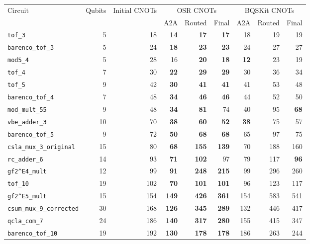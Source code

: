 \begin{table}[p]
\centering
\scriptsize
\begin{tabular}{lrr|rrr|rrr}
\hline
Circuit & Qubits & Initial CNOTs & \multicolumn{3}{c|}{OSR CNOTs} & \multicolumn{3}{c}{BQSKit CNOTs} \\
 & & & A2A & Routed & Final & A2A & Routed & Final \\
\hline
\texttt{tof\_3} & 5 & 18 & \textbf{14} & \textbf{17} & \textbf{17} & 18 & 19 & 19 \\
\texttt{barenco\_tof\_3} & 5 & 24 & \textbf{18} & \textbf{23} & \textbf{23} & 24 & 27 & 27 \\
\texttt{mod5\_4} & 5 & 28 & 16 & \textbf{20} & \textbf{18} & \textbf{12} & 23 & 19 \\
\texttt{tof\_4} & 7 & 30 & \textbf{22} & \textbf{29} & \textbf{29} & 30 & 36 & 34 \\
\texttt{tof\_5} & 9 & 42 & \textbf{30} & \textbf{41} & \textbf{41} & 41 & 53 & 48 \\
\texttt{barenco\_tof\_4} & 7 & 48 & \textbf{34} & \textbf{46} & \textbf{46} & 44 & 52 & 50 \\
\texttt{mod\_mult\_55} & 9 & 48 & \textbf{34} & \textbf{81} & 74 & 40 & 95 & \textbf{68} \\
\texttt{vbe\_adder\_3} & 10 & 70 & \textbf{38} & \textbf{60} & \textbf{52} & \textbf{38} & 75 & 57 \\
\texttt{barenco\_tof\_5} & 9 & 72 & \textbf{50} & \textbf{68} & \textbf{68} & 65 & 97 & 75 \\
\texttt{csla\_mux\_3\_original} & 15 & 80 & \textbf{68} & \textbf{155} & \textbf{139} & 70 & 188 & 160 \\
\texttt{rc\_adder\_6} & 14 & 93 & \textbf{71} & \textbf{102} & 97 & 79 & 117 & \textbf{96} \\
\texttt{gf2\textasciicircum{}E4\_mult} & 12 & 99 & \textbf{91} & \textbf{248} & \textbf{215} & 99 & 296 & 260 \\
\texttt{tof\_10} & 19 & 102 & \textbf{70} & \textbf{101} & \textbf{101} & 96 & 123 & 117 \\
\texttt{gf2\textasciicircum{}E5\_mult} & 15 & 154 & \textbf{149} & \textbf{426} & \textbf{361} & 154 & 583 & 541 \\
\texttt{csum\_mux\_9\_corrected} & 30 & 168 & \textbf{126} & \textbf{345} & \textbf{289} & 132 & 446 & 417 \\
\texttt{qcla\_com\_7} & 24 & 186 & \textbf{140} & \textbf{317} & \textbf{280} & 155 & 415 & 347 \\
\texttt{barenco\_tof\_10} & 19 & 192 & \textbf{130} & \textbf{178} & \textbf{178} & 186 & 263 & 244 \\

\end{tabular}
\end{table}
